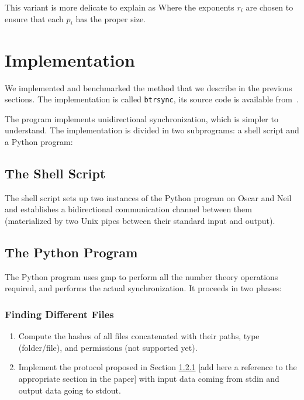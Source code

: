 \documentclass[11pt]{llncs}
\newcommand{\btrsync}{\texttt{btrsync}\xspace}
\begin{document}
This variant is more delicate to explain as Where the exponents $r_i$ are chosen to ensure that each $p_i$ has the proper size.

\section{Implementation}
\label{program}

We implemented and benchmarked the method that we describe in the previous
sections. The implementation is called \btrsync, its source code is available
from~\cite{Robin}.

\smallskip

The program implements unidirectional synchronization, which is simpler to
understand. The implementation is divided in two subprograms: a shell script and
a Python program:

\subsection{The Shell Script}

The shell script sets up two instances of the Python program on Oscar and Neil
and establishes a bidirectional communication channel between them (materialized
by two Unix pipes between their standard input and output).

\subsection{The Python Program}

The Python program uses gmp to perform all the number theory operations required,
and performs the actual synchronization. It proceeds in two phases:

\subsubsection{Finding Different Files}

\begin{enumerate}
\item Compute the hashes of all files concatenated with their paths, type (folder/file), and permissions (not supported yet).
\item Implement the protocol proposed in Section \ref{} [add here a reference to the appropriate section in the paper] with input data coming from stdin and output data going to stdout.
\end{enumerate}
\end{document}
